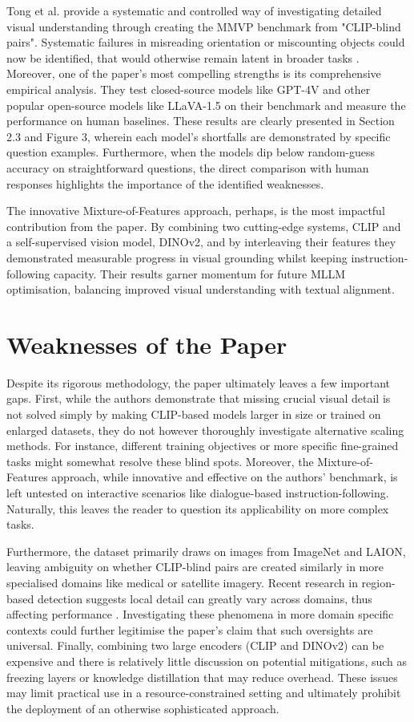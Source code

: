 \documentclass[11pt]{article}
\begin{document}
Tong et al. provide a systematic and controlled way of investigating detailed visual understanding through creating the MMVP benchmark from "CLIP-blind pairs". Systematic failures in misreading orientation or miscounting objects could now be identified, that would otherwise remain latent in broader tasks \cite{Tong2024CVPR}.
Moreover, one of the paper's  most compelling strengths is its comprehensive empirical analysis. They test closed-source models like GPT-4V and other popular open-source models like LLaVA-1.5 on their benchmark and measure the performance on human baselines. These results are clearly presented in Section 2.3 and Figure 3, wherein each model's shortfalls are demonstrated by specific question examples.
Furthermore, when the models dip below random-guess accuracy on straightforward questions, the direct comparison with human responses highlights the importance of the identified weaknesses.

The innovative Mixture-of-Features approach, perhaps, is the most impactful contribution from the paper. By combining two cutting-edge systems, CLIP and a self-supervised vision model, DINOv2, and by interleaving their features they demonstrated measurable progress in visual grounding whilst keeping instruction-following capacity.
Their results garner momentum for future MLLM optimisation, balancing improved visual understanding with textual alignment.

\section*{Weaknesses of the Paper}

Despite its rigorous methodology, the paper ultimately leaves a few important gaps. First, while the authors demonstrate that missing crucial visual detail is not solved simply by making CLIP-based models larger in size or trained on enlarged datasets, they do not however thoroughly investigate alternative scaling methods.
For instance, different training objectives or more specific fine-grained tasks might somewhat resolve these blind spots. Moreover, the Mixture-of-Features approach, while innovative and effective on the authors' benchmark, is left untested on interactive scenarios like dialogue-based instruction-following. Naturally, this leaves the reader to question its applicability on more complex tasks.

Furthermore, the dataset primarily draws on images from ImageNet and LAION, leaving ambiguity on whether CLIP-blind pairs are created similarly in more specialised domains like medical or satellite imagery. Recent research in region-based detection suggests local detail can greatly vary across domains, thus affecting performance \cite{CHEN2018CVPR}.
Investigating these phenomena in more domain specific contexts could further legitimise the paper's claim that such oversights are universal.
Finally, combining two large encoders (CLIP and DINOv2) can be expensive and there is relatively little discussion on potential mitigations, such as freezing layers or knowledge distillation that may reduce overhead. These issues may limit practical use in a resource-constrained setting and ultimately prohibit the deployment of an otherwise sophisticated approach.
\end{document}
